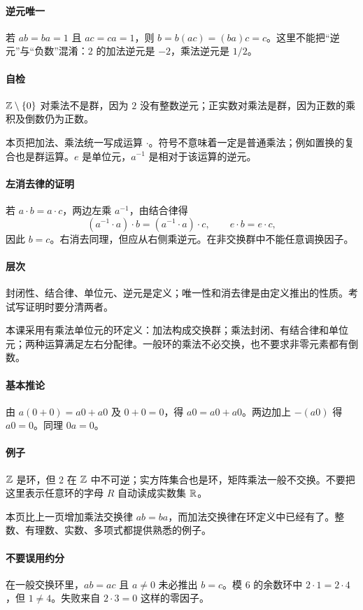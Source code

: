 \paragraph{逆元唯一}若 $ab=ba=1$ 且 $ac=ca=1$，则 $b=b(ac)=(ba)c=c$。这里不能把“逆元”与“负数”混淆：$2$ 的加法逆元是 $-2$，乘法逆元是 $1/2$。
\paragraph{自检}$\mathbb{Z}\setminus\{0\}$ 对乘法不是群，因为 $2$ 没有整数逆元；正实数对乘法是群，因为正数的乘积及倒数仍为正数。

本页把加法、乘法统一写成运算 $\cdot$。符号不意味着一定是普通乘法；例如置换的复合也是群运算。$e$ 是单位元，$a^{-1}$ 是相对于该运算的逆元。
\paragraph{左消去律的证明}若 $a\cdot b=a\cdot c$，两边左乘 $a^{-1}$，由结合律得
\[(a^{-1}\cdot a)\cdot b=(a^{-1}\cdot a)\cdot c,\qquad e\cdot b=e\cdot c,\]
因此 $b=c$。右消去同理，但应从右侧乘逆元。在非交换群中不能任意调换因子。
\paragraph{层次}封闭性、结合律、单位元、逆元是定义；唯一性和消去律是由定义推出的性质。考试写证明时要分清两者。

本课采用有乘法单位元的环定义：加法构成交换群；乘法封闭、有结合律和单位元；两种运算满足左右分配律。一般环的乘法不必交换，也不要求非零元素都有倒数。
\paragraph{基本推论}由 $a(0+0)=a0+a0$ 及 $0+0=0$，得 $a0=a0+a0$。两边加上 $-(a0)$ 得 $a0=0$。同理 $0a=0$。
\paragraph{例子}$\mathbb{Z}$ 是环，但 $2$ 在 $\mathbb{Z}$ 中不可逆；实方阵集合也是环，矩阵乘法一般不交换。不要把这里表示任意环的字母 $R$ 自动读成实数集 $\mathbb{R}$。

本页比上一页增加乘法交换律 $ab=ba$，而加法交换律在环定义中已经有了。整数、有理数、实数、多项式都提供熟悉的例子。
\paragraph{不要误用约分}在一般交换环里，$ab=ac$ 且 $a\ne0$ 未必推出 $b=c$。模 $6$ 的余数环中 $2\cdot1=2\cdot4$，但 $1\ne4$。失败来自 $2\cdot3=0$ 这样的零因子。
